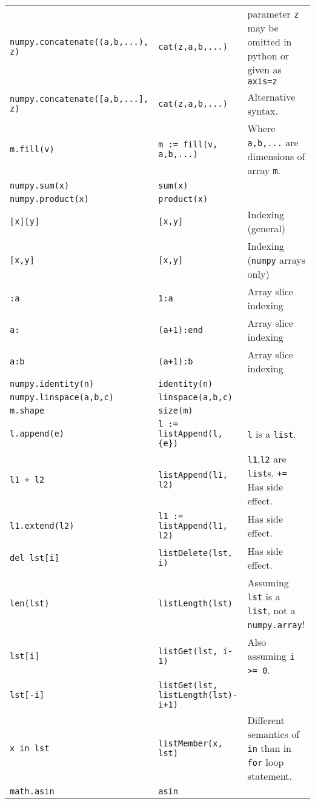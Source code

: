 \documentclass[a4paper,10pt]{article}
\begin{document}
\begin{tabularx}{\textwidth}{|l|l|p{5cm}|}
\tt numpy.concatenate((a,b,...), z) & \tt cat(z,a,b,...) & parameter {\tt z} may be omitted in python or given as {\tt axis=z} \\
\tt numpy.concatenate([a,b,...], z) & \tt cat(z,a,b,...) & Alternative syntax. \\
\tt m.fill(v) & \tt m := fill(v, a,b,...) & Where {\tt a,b,...} are dimensions of array {\tt m}. \\
\tt numpy.sum(x) & \tt sum(x) & \\
\tt numpy.product(x) & \tt product(x) & \\
\tt [x][y] & \tt [x,y] & Indexing (general) \\
\tt [x,y] & \tt [x,y] & Indexing ({\tt numpy} arrays only) \\
\tt :a & \tt 1:a & Array slice indexing \\
\tt a: & \tt (a+1):end & Array slice indexing \\
\tt a:b & \tt (a+1):b & Array slice indexing \\
\tt numpy.identity(n) & \tt identity(n) & \\
\tt numpy.linspace(a,b,c) & \tt linspace(a,b,c) & \\
\tt m.shape & \tt size(m) & \\
\tt l.append(e) & \tt l := listAppend(l, \{e\}) & {\tt l} is a {\tt list}. \\
\tt l1 + l2 & \tt listAppend(l1, l2) & {\tt l1},{\tt l2} are {\tt list}s. {\tt +=} Has side effect. \\ 
\tt l1.extend(l2) & \tt l1 := listAppend(l1, l2) & Has side effect. \\ 

\tt del lst[i] & \tt listDelete(lst, i) & Has side effect. \\
\tt len(lst) & \tt listLength(lst) & Assuming {\tt lst} is a {\tt list}, not a {\tt numpy.array}! \\
\tt lst[i] & \tt listGet(lst, i-1) & Also assuming {\tt i >= 0}. \\
\tt lst[-i] & \tt listGet(lst, listLength(lst)-i+1) & \\
\tt x in lst & \tt listMember(x, lst) & Different semantics of {\tt in} than in {\tt for} loop statement. \\
\tt math.asin & \tt asin & \\
\hline
\end{tabularx}
\end{document}
